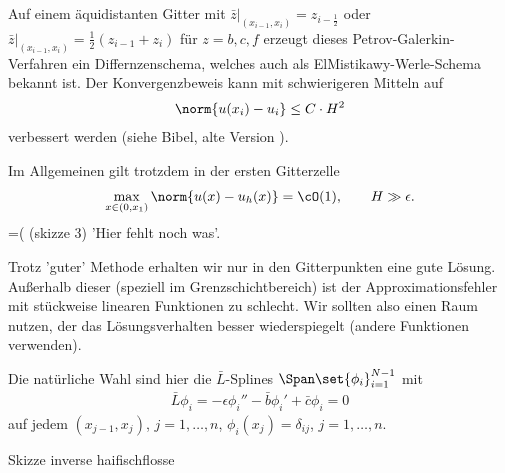 \begin{bemerkung*}
  Auf einem äquidistanten Gitter mit $\bar z|_{(x_{i-1}, x_{i})} = z_{i - \frac 12}$ oder $\bar z|_{(x_{i-1}, x_{i})} = \frac 12 (z_{i-1} + z_{i})$ für $z = b, c, f$ erzeugt dieses Petrov-Galerkin-Verfahren ein Differnzenschema, welches auch als ElMistikawy-Werle-Schema bekannt ist. Der Konvergenzbeweis kann mit schwierigeren Mitteln auf
  \begin{align*}
    \norm{u(x_{i}) - u_{i}} \leq C\cdot H^{2}
  \end{align*}
  verbessert werden (siehe Bibel, alte Version ).
\end{bemerkung*}
Im Allgemeinen gilt trotzdem in der ersten Gitterzelle
\begin{align*}
  \max_{x \in (0, x_{1})} \norm{u(x) - u_{h}(x)} = \cO(1), \qquad H \gg\epsilon. 
\end{align*}
=( (skizze 3) 'Hier fehlt noch was'. 

Trotz 'guter' Methode erhalten wir nur in den Gitterpunkten eine gute Lösung. Außerhalb dieser (speziell im Grenzschichtbereich) ist der Approximationsfehler mit stückweise linearen Funktionen zu schlecht. Wir sollten also einen Raum nutzen, der das Lösungsverhalten besser wiederspiegelt (andere Funktionen verwenden). 

Die natürliche Wahl sind hier die $\bar L$-Splines $\Span \set{\phi_{i}}_{i = 1}^{N-1}$ mit
\begin{align*}
  \bar L \phi_{i} = - \epsilon \phi_{i}''  - \bar b \phi_{i}' + \bar c \phi_{i} = 0
\end{align*}
auf jedem $(x_{j-1}, x_{j})$, $j = 1, \dots, n$, $\phi_{i}(x_{j}) = \delta_{ij}$, $j = 1, \dots, n$. 

Skizze inverse haifischflosse


